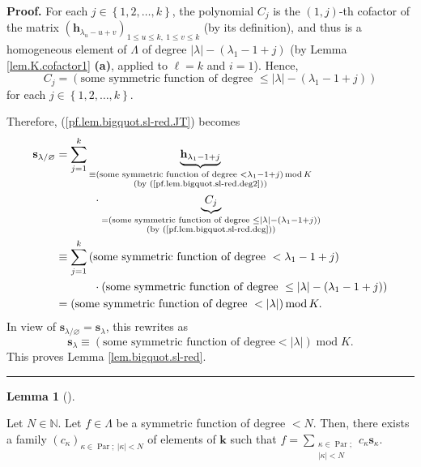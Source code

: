 \documentclass[numbers=enddot,12pt,final,onecolumn,notitlepage]{scrartcl}%
\theoremstyle{definition}
\newtheorem{lem}[theo]{Lemma}
\newenvironment{lemma}[1][]
{\begin{lem}[#1]\begin{leftbar}}
{\end{leftbar}\end{lem}}
\newenvironment{proof}[1][Proof]{\noindent\textbf{#1.} }{\ \rule{0.5em}{0.5em}}
\let\sumnonlimits\sum
\renewcommand{\sum}{\sumnonlimits\limits}
\begin{document}
\begin{proof}
For each $j\in\left\{  1,2,\ldots,k\right\}  $, the polynomial $C_{j}$ is the
$\left(  1,j\right)  $-th cofactor of the matrix $\left(  \mathbf{h}%
_{\lambda_{u}-u+v}\right)  _{1\leq u\leq k,\ 1\leq v\leq k}$ (by its
definition), and thus is a homogeneous element of $\Lambda$ of degree
$\left\vert \lambda\right\vert -\left(  \lambda_{1}-1+j\right)  $ (by Lemma
\ref{lem.K.cofactor1} \textbf{(a)}, applied to $\ell=k$ and $i=1$). Hence,%
\begin{equation}
C_{j}=\left(  \text{some symmetric function of degree }\leq\left\vert
\lambda\right\vert -\left(  \lambda_{1}-1+j\right)  \right)
\label{pf.lem.bigquot.sl-red.deg}%
\end{equation}
for each $j\in\left\{  1,2,\ldots,k\right\}  $.

Therefore, (\ref{pf.lem.bigquot.sl-red.JT}) becomes%
\begin{align*}
\mathbf{s}_{\lambda/\varnothing}  &  =\sum_{j=1}^{k}\underbrace{\mathbf{h}%
_{\lambda_{1}-1+j}}_{\substack{\equiv\left(  \text{some symmetric function of
degree }<\lambda_{1}-1+j\right)  \operatorname{mod}K\\\text{(by
(\ref{pf.lem.bigquot.sl-red.deg2}))}}}\\
&  \ \ \ \ \ \ \ \ \ \ \cdot\underbrace{C_{j}}_{\substack{=\left(  \text{some
symmetric function of degree }\leq\left\vert \lambda\right\vert -\left(
\lambda_{1}-1+j\right)  \right)  \\\text{(by (\ref{pf.lem.bigquot.sl-red.deg}%
))}}}\\
&  \equiv\sum_{j=1}^{k}\left(  \text{some symmetric function of degree
}<\lambda_{1}-1+j\right) \\
&  \ \ \ \ \ \ \ \ \ \ \cdot\left(  \text{some symmetric function of degree
}\leq\left\vert \lambda\right\vert -\left(  \lambda_{1}-1+j\right)  \right) \\
&  =\left(  \text{some symmetric function of degree }<\left\vert
\lambda\right\vert \right)  \operatorname{mod}K.
\end{align*}
In view of $\mathbf{s}_{\lambda/\varnothing}=\mathbf{s}_{\lambda}$, this
rewrites as
\[
\mathbf{s}_{\lambda}\equiv\left(  \text{some symmetric function of degree
}<\left\vert \lambda\right\vert \right)  \operatorname{mod}K.
\]
This proves Lemma \ref{lem.bigquot.sl-red}.
\end{proof}

\begin{lemma}
\label{lem.bigquot.sm-as-smaller}Let $N\in\mathbb{N}$. Let $f\in\Lambda$ be a
symmetric function of degree $<N$. Then, there exists a family $\left(
c_{\kappa}\right)  _{\kappa\in\operatorname*{Par};\ \left\vert \kappa
\right\vert <N}$ of elements of $\mathbf{k}$ such that $f=\sum
_{\substack{\kappa\in\operatorname*{Par};\\\left\vert \kappa\right\vert
<N}}c_{\kappa}\mathbf{s}_{\kappa}$.
\end{lemma}
\end{document}
